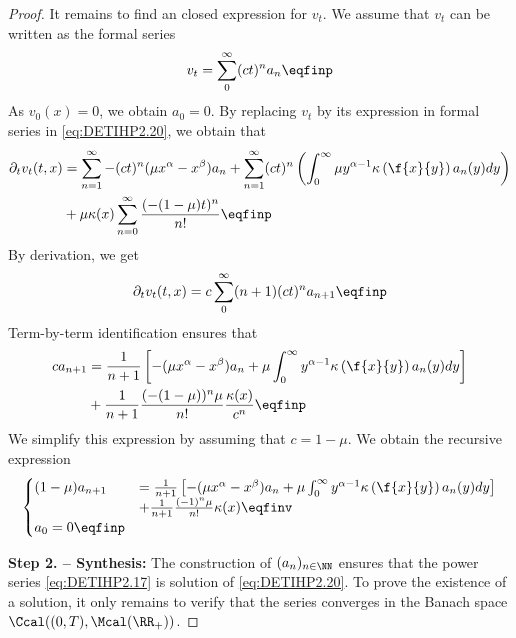 \begin{proof}
It remains to find an closed expression for $v_t$. We assume that $v_t$ can be written as the formal series
\begin{align}
    v_t = \sum_0^\infty (c t)^n a_n
    \eqfinp
    \label{eq:DETIHP2.17}
\end{align}
As $v_0(x) = 0$, we obtain $a_0 = 0$. 
By replacing $v_t$ by its expression in formal series in \eqref{eq:DETIHP2.20}, we obtain that
\begin{align*}
    \partial_t v_t(t,x)
    &=  
    \sum_{n = 1}^{\infty} -(c t)^n (\mu x^{\alpha} - x^\beta) a_n 
    + \sum_{n = 1}^{\infty} (c t)^n \left(  \int_0^\infty \mu y^{\alpha-1} \kappa \left( \f{x}{y}\right) a_n(y) dy\right) \\
    &+ \mu \kappa(x) \sum_{n = 0}^{\infty}\frac{(-(1-\mu)t)^n}{n!}\eqfinp
\end{align*}
By derivation, we get
\begin{align*}
   \partial_t v_t(t,x) = c \sum_0^\infty (n+1)(c t)^n a_{n+1}
    \eqfinp
\end{align*}
Term-by-term identification ensures that
\begin{align*}
    c a_{n+1} 
    &= \frac{1}{n+1}\left[ -(\mu x^{\alpha} - x^\beta) a_n + \mu \int_0^\infty y^{\alpha-1} \kappa \left( \f{x}{y}\right) a_n(y) dy \right] \\
    &+ \frac{1}{n+1} \frac{(-(1-\mu))^n \mu }{n!}\frac{\kappa(x)}{c^n}
    \eqfinp
\end{align*}
We simplify this expression by assuming that $c = 1-\mu$. We obtain the recursive expression
\begin{align*}
    \begin{cases}
    (1-\mu) a_{n+1} 
    &= \frac{1}{n+1}\left[ -(\mu x^{\alpha} - x^\beta) a_n + \mu \int_0^\infty y^{\alpha-1} \kappa \left( \f{x}{y}\right) a_n(y) dy \right] \\
    &+ \frac{1}{n+1} \frac{(-1)^n \mu }{n!}\kappa(x) 
    \eqfinv \\
    a_0 = 0 \eqfinp
    \end{cases}
\end{align*}

\textbf{Step 2. -- Synthesis:} The construction of $(a_n)_{n\in\NN}$ ensures that the power series \eqref{eq:DETIHP2.17} is solution of \eqref{eq:DETIHP2.20}. To prove the existence of a solution, it only remains to verify that the series converges in the Banach space $\Ccal((0, T), \Mcal(\RR_+))$.


\end{proof}
